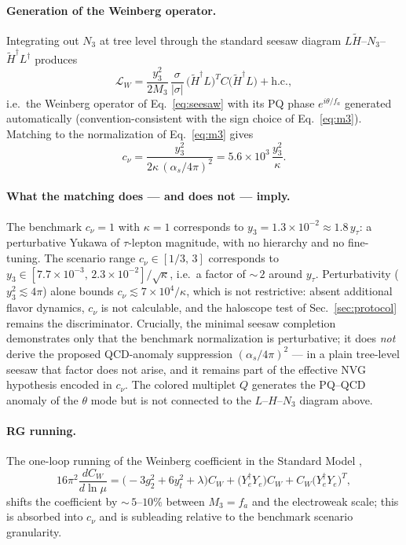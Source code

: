 \documentclass[11pt,a4paper]{article}
\begin{document}
\paragraph{Generation of the Weinberg operator.} Integrating out $N_3$ at
tree level through the standard seesaw diagram
$L\tilde H$--$N_3$--$\tilde H^{\dagger}L^{\dagger}$ produces
\begin{equation}
\mathcal{L}_{W} = \frac{y_3^{2}}{2M_3}\,
\frac{\sigma}{|\sigma|}\,
\bigl(\tilde H^{\dagger}L\bigr)^{T}C\bigl(\tilde H^{\dagger}L\bigr)
+ \text{h.c.},
\end{equation}
i.e.\ the Weinberg operator of Eq.~\eqref{eq:seesaw} with its PQ phase
$e^{i\theta/f_a}$ generated automatically (convention-consistent with the
sign choice of Eq.~\eqref{eq:m3}). Matching to the normalization
of Eq.~\eqref{eq:m3} gives
\begin{equation}
c_\nu = \frac{y_3^{2}}{2\kappa\,(\alpha_s/4\pi)^{2}}
= 5.6\times 10^{3}\,\frac{y_3^{2}}{\kappa}.
\label{eq:matching}
\end{equation}

\paragraph{What the matching does --- and does not --- imply.}
The benchmark $c_\nu = 1$ with $\kappa = 1$ corresponds to
$y_3 = 1.3\times 10^{-2} \approx 1.8\,y_\tau$: a perturbative Yukawa of
$\tau$-lepton magnitude, with no hierarchy and no fine-tuning. The scenario
range $c_\nu \in [1/3,\,3]$ corresponds to
$y_3 \in [7.7\times 10^{-3},\,2.3\times 10^{-2}]/\sqrt{\kappa}$, i.e.\ a
factor of ${\sim}\,2$ around $y_\tau$. Perturbativity
($y_3^2 \lesssim 4\pi$) alone bounds
$c_\nu \lesssim 7\times 10^{4}/\kappa$, which is not restrictive: absent
additional flavor dynamics, $c_\nu$ is not calculable, and the haloscope
test of Sec.~\ref{sec:protocol} remains the discriminator.
Crucially, the minimal seesaw completion demonstrates only that the
benchmark normalization is perturbative; it does \emph{not} derive the
proposed QCD-anomaly suppression $(\alpha_s/4\pi)^{2}$ --- in a plain
tree-level seesaw that factor does not arise, and it remains part of the
effective NVG hypothesis encoded in $c_\nu$. The colored multiplet $Q$
generates the PQ--QCD anomaly of the $\theta$ mode but is not connected to
the $L$--$H$--$N_3$ diagram above.

\paragraph{RG running.} The one-loop running of the Weinberg coefficient in
the Standard Model \cite{AntuschRG},
\begin{equation}
16\pi^{2}\frac{dC_W}{d\ln\mu} =
\bigl(-3g_2^{2} + 6y_t^{2} + \lambda\bigr)C_W
+ \bigl(Y_e^{\dagger}Y_e\bigr)C_W + C_W\bigl(Y_e^{\dagger}Y_e\bigr)^{T},
\end{equation}
shifts the coefficient by ${\sim}\,5$--$10\%$ between $M_3 = f_a$ and the
electroweak scale; this is absorbed into $c_\nu$ and is subleading relative
to the benchmark scenario granularity.
\end{document}

